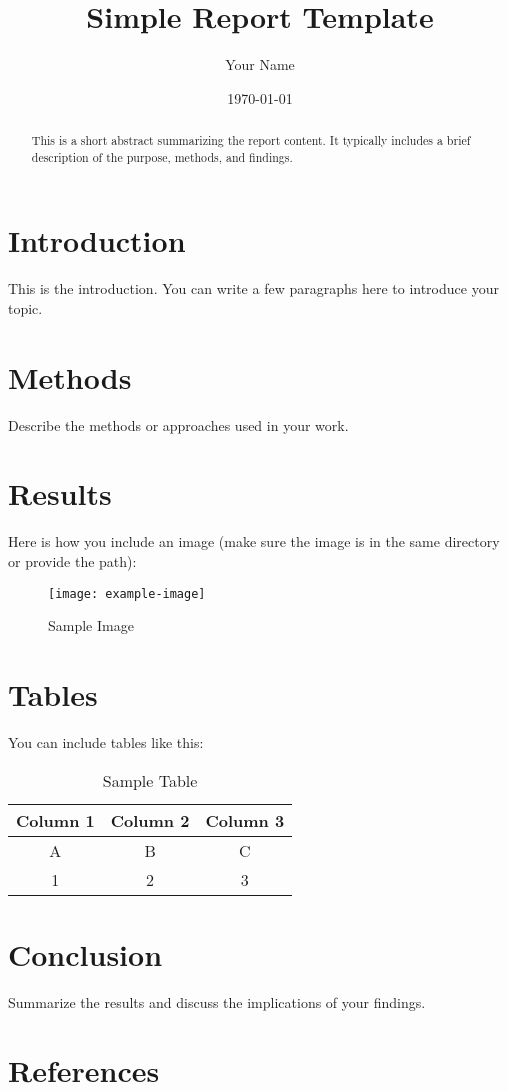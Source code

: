 \documentclass[a4paper,12pt]{article}
\title{Simple Report Template}
\author{Your Name}
\date{\today}
\begin{document}
\maketitle

\begin{abstract}
This is a short abstract summarizing the report content. It typically includes a brief description of the purpose, methods, and findings.
\end{abstract}

\section{Introduction}
This is the introduction. You can write a few paragraphs here to introduce your topic.

\section{Methods}
Describe the methods or approaches used in your work.

\section{Results}
Here is how you include an image (make sure the image is in the same directory or provide the path):

\begin{figure}[H]
    \centering
    \texttt{[image: example-image]} %
    \caption{Sample Image}
    \label{fig:sample-image}
\end{figure}

\section{Tables}
You can include tables like this:

\begin{table}[H]
    \centering
    \begin{tabular}{|c|c|c|}
        \hline
        Column 1 & Column 2 & Column 3 \\
        \hline
        A & B & C \\
        1 & 2 & 3 \\
        \hline
    \end{tabular}
    \caption{Sample Table}
    \label{tab:sample-table}
\end{table}

\section{Conclusion}
Summarize the results and discuss the implications of your findings.

\section*{References}

\end{document}
